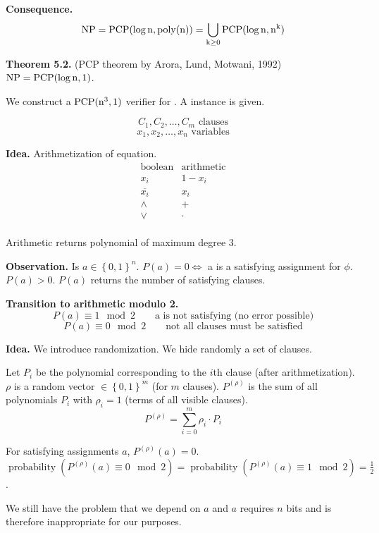 \documentclass[a4paper]{article}
\newcommand{\cls}[1]{\rm{#1}}
\newcommand{\probl}[1]{\text{\textsc{#1}}}
\newcommand{\set}[1]{\left\{#1\right\}}
\DeclareMathOperator{\prop}{probability}
\begin{document}
\textbf{Consequence.}
\[
  \cls{NP} = \cls{PCP}(\log{n}, \operatorname{poly}(n))
    = \bigcup_{k \geq 0} \cls{PCP}(\log{n}, n^k)
\]

\textbf{Theorem 5.2.} (PCP theorem by Arora, Lund, Motwani, 1992)
  $\cls{NP} = \cls{PCP}(\log{n}, 1)$.

We construct a $\cls{PCP}(n^3, 1)$ verifier for \probl{3~SAT}.
A \probl{3~SAT} instance is given.

\[
  C_1, C_2, \ldots, C_m \text{ clauses}
\] \[
  x_1, x_2, \ldots, x_n \text{ variables}
\]

\textbf{Idea.} Arithmetization of \probl{3~SAT} equation.
\begin{displaymath}
 \begin{array}{cc}
  \text{boolean}  & \text{arithmetic} \\
  x_i             & 1 - x_i \\
  \overline{x_i}  & x_i \\
  \land           & + \\
  \lor            & \cdot \\
 \end{array}
\end{displaymath}

Arithmetic returns polynomial of maximum degree $3$.

\textbf{Observation.}
  Is $a \in \set{0,1}^n$. $P(a) = 0 \Leftrightarrow$
  a is a satisfying assignment for $\phi$.
  $P(a) > 0$. $P(a)$ returns the number of satisfying
  clauses.

\textbf{Transition to arithmetic modulo 2.}
  \[
    P(a) \equiv 1 \mod{2}  \qquad{\text{a is not satisfying (no error possible)}}
  \] \[
    P(a) \equiv 0 \mod{2}  \qquad{\text{not all clauses must be satisfied}}
  \]

\textbf{Idea.} We introduce randomization.
  We hide randomly a set of clauses.

Let $P_i$ be the polynomial corresponding to the $i$th clause
(after arithmetization).
$\rho$ is a random vector $\in \set{0,1}^m$ (for $m$ clauses).
$P^{(\rho)}$ is the sum of all polynomials $P_i$ with $\rho_i = 1$
(terms of all visible clauses).
\[
  P^{(\rho)} = \sum_{i=0}^m \rho_i \cdot P_i
\]

For satisfying assignments $a$, $P^{(\rho)}(a) = 0$.
$\prop(P^{(\rho)}(a) \equiv 0 \mod{2}) =
\prop(P^{(\rho)}(a) \equiv 1 \mod{2}) = \frac12$.

We still have the problem that we depend on $a$ and
$a$ requires $n$ bits and is therefore inappropriate for our purposes.
\end{document}
